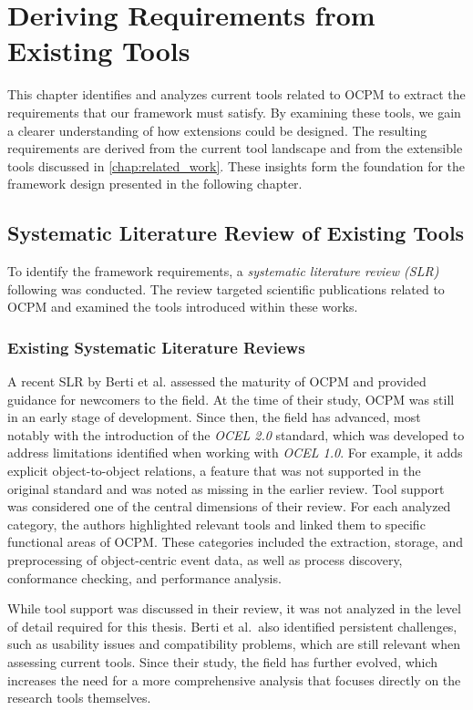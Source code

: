 \chapter{Deriving Requirements from Existing Tools}
\label{chap:requirements}

This chapter identifies and analyzes current tools related to OCPM to extract the requirements that our framework must satisfy.
By examining these tools, we gain a clearer understanding of how extensions could be designed.
The resulting requirements are derived from the current tool landscape and from the extensible tools discussed in \cref{chap:related_work}.
These insights form the foundation for the framework design presented in the following chapter.

\section{Systematic Literature Review of Existing Tools}

To identify the framework requirements, a \textit{systematic literature review (SLR)} following \cite{slrguidelines} was conducted.
The review targeted scientific publications related to OCPM and examined the tools introduced within these works.

\subsection{Existing Systematic Literature Reviews}

A recent SLR by Berti et al.\cite{review1} assessed the maturity of OCPM and provided guidance for newcomers to the field. At the time of their study, OCPM was still in an early stage of development. Since then, the field has advanced, most notably with the introduction of the \textit{OCEL 2.0} standard, which was developed to address limitations identified when working with \textit{OCEL 1.0}. For example, it adds explicit object-to-object relations, a feature that was not supported in the original standard and was noted as missing in the earlier review.
Tool support was considered one of the central dimensions of their review. For each analyzed category, the authors highlighted relevant tools and linked them to specific functional areas of OCPM. These categories included the extraction, storage, and preprocessing of object-centric event data, as well as process discovery, conformance checking, and performance analysis.

While tool support was discussed in their review, it was not analyzed in the level of detail required for this thesis. Berti et al.\ also identified persistent challenges, such as usability issues and compatibility problems, which are still relevant when assessing current tools. Since their study, the field has further evolved, which increases the need for a more comprehensive analysis that focuses directly on the research tools themselves.

